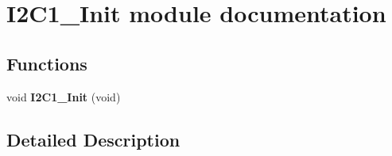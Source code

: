 \hypertarget{group___i2_c1___init__module}{}\section{I2\+C1\+\_\+\+Init module documentation}
\label{group___i2_c1___init__module}
\subsection*{Functions}
\begin{DoxyCompactItemize}
\item 
void {\bfseries I2\+C1\+\_\+\+Init} (void)\hypertarget{group___i2_c1___init__module_ga430209a4fbf1bf97ef338b1c82ec83d4}{}\label{group___i2_c1___init__module_ga430209a4fbf1bf97ef338b1c82ec83d4}

\end{DoxyCompactItemize}


\subsection{Detailed Description}
